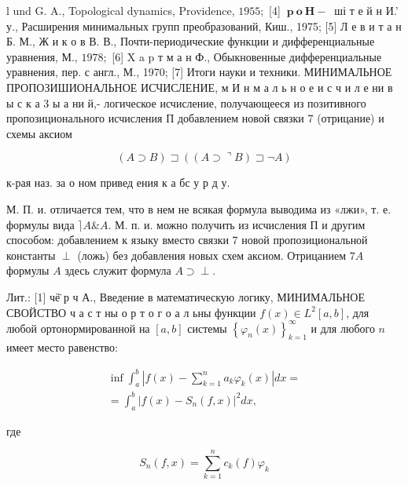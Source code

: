 \documentclass[10pt]{article}
\begin{document}
l und G. A., Topological dynamics, Providence, $1955 ;$ [4] $\mathbf{~ p ~ o ~ H - ~}$ ші т е й н И.' у., Расширения минимальных групп преобразований, Киш., 1975; [5] Л е в и т а н Б. М., Ж и к о в В. В., Почти-периодические функции и дифференциальные уравнения, М., $1978 ;$ [6] X a p т м а н Ф., Обыкновенные дифференциальные уравнения, пер. с англ., М., 1970; [7] Итоги науки и техники. МИНИМАЛЬНОЕ ПРОПОЗИШИОНАЛЬНОЕ ИСЧИСЛЕНИЕ, м И н м а л ь н о е и с ч и л е ни в ы с к а 3 ы а ни й,- логическое исчисление, получающееся из позитивного пропозиционального исчисления П добавлением новой связки 7 (отрицание) и схемы аксиом



\[

(A \supset B) \sqsupset((A \supset\urcorner B) \sqsupset \neg A)

\]



к-рая наз. за о ном привед ения к а бс у р д у.



М. П. и. отличается тем, что в нем не всякая формула выводима из «лжи», т. е. формулы вида $\rceil A \& A$. М. п. и. можно получить из исчисления П и другим способом: добавлением к языку вместо связки 7 новой пропозициональной константы $\perp$ (ложь) без добавления новых схем аксиом. Отрицанием $7 A$ формулы $A$ здесь служит формула $A \supset \perp$.



Лит.: [1] чё̈ р ч А., Введение в математическую логику, МИНИМАЛЬНОЕ СВОЙСТВО ч а с т ны о р т о г о а л ьны функции $f(x) \in L^{2}[a, b]$, для любой ортонормированной на $[a, b]$ системы $\left\{\varphi_{n}(x)\right\}_{k=1}^{\infty}$ и для любого $n$ имеет место равенство:



\[

\begin{gathered}

\inf \int_{a}^{b}\left|f(x)-\sum_{k=1}^{n} a_{k} \varphi_{k}(x)\right| d x= \\

=\int_{a}^{b}\left|f(x)-S_{n}(f, x)\right|^{2} d x,

\end{gathered}

\]



где



\[

S_{n}(f, x)=\sum_{k=1}^{n} c_{k}(f) \varphi_{k}

\]
\end{document}
